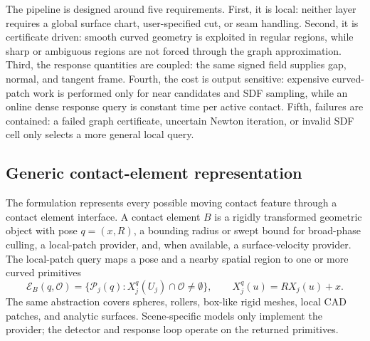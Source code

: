 \documentclass[preprint,12pt]{elsarticle}
\newcommand{\Pc}{\mathcal{P}}
\newcommand{\Oc}{\mathcal{O}}
\begin{document}
The pipeline is designed around five requirements. First, it is local: neither layer requires a global surface chart, user-specified cut, or seam handling. Second, it is certificate driven: smooth curved geometry is exploited in regular regions, while sharp or ambiguous regions are not forced through the graph approximation. Third, the response quantities are coupled: the same signed field supplies gap, normal, and tangent frame. Fourth, the cost is output sensitive: expensive curved-patch work is performed only for near candidates and SDF sampling, while an online dense response query is constant time per active contact. Fifth, failures are contained: a failed graph certificate, uncertain Newton iteration, or invalid SDF cell only selects a more general local query.

\subsection{Generic contact-element representation}

The formulation represents every possible moving contact feature through a contact element interface. A contact element $B$ is a rigidly transformed geometric object with pose $q=(x,R)$, a bounding radius or swept bound for broad-phase culling, a local-patch provider, and, when available, a surface-velocity provider. The local-patch query maps a pose and a nearby spatial region to one or more curved primitives
\begin{equation}
    \mathcal{E}_B(q,\Oc)=
    \{\Pc_j(q): X_j^q(U_j)\cap \Oc\ne\emptyset\},
    \qquad
    X_j^q(u)=R X_j(u)+x .
    \label{eq:contact_element_provider}
\end{equation}
The same abstraction covers spheres, rollers, box-like rigid meshes, local CAD patches, and analytic surfaces. Scene-specific models only implement the provider; the detector and response loop operate on the returned primitives.
\end{document}
